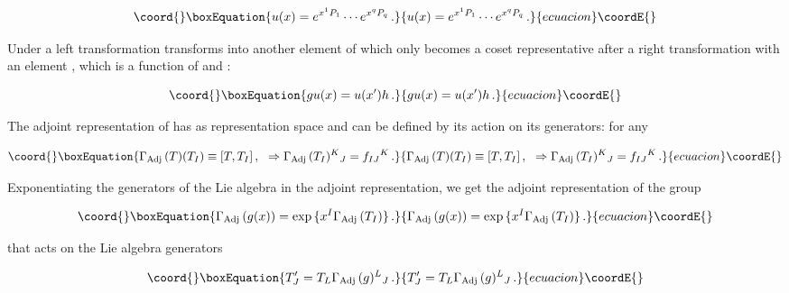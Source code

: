 \documentclass[12pt,a4paper]{article}
\begin{document}
\begin{equation}\coord{}\boxEquation{
\label{eq:cosetrepresentative}
u(x) =  e^{x^{1}P_{1}}\cdots  e^{x^{q}P_{q}}\, .  
}{
u(x) =  e^{x^{1}P_{1}}\cdots  e^{x^{q}P_{q}}\, .  
}{ecuacion}\coordE{}\end{equation}

Under a left transformation \coordHE{}  \coordHE{} transforms into another
element of \coordHE{} which only becomes a coset representative
\coordHE{} after a right transformation with an element \coordHE{},
which is a function of \coordHE{} and \coordHE{}:

\begin{equation}\coord{}\boxEquation{
gu(x) = u(x^{\prime}) h\, .  
}{
gu(x) = u(x^{\prime}) h\, .  
}{ecuacion}\coordE{}\end{equation}

The adjoint representation of \coordHE{} has as representation
space \coordHE{} and can be defined by its action on its
generators: for any \coordHE{}

\begin{equation}\coord{}\boxEquation{
\Gamma_{\rm Adj}\, (T) (T_{I})\equiv [T,T_{I}]\, ,
\,\,\,\, \Rightarrow 
\Gamma_{\rm Adj}\, (T_{I})^{K}{}_{J}= f_{IJ}{}^{K}\, .
}{
\Gamma_{\rm Adj}\, (T) (T_{I})\equiv [T,T_{I}]\, ,
\,\,\,\, \Rightarrow 
\Gamma_{\rm Adj}\, (T_{I})^{K}{}_{J}= f_{IJ}{}^{K}\, .
}{ecuacion}\coordE{}\end{equation}

Exponentiating the generators of the Lie algebra \coordHE{} in the
adjoint representation, we get the adjoint representation of the group
\coordHE{}

\begin{equation}\coord{}\boxEquation{
\Gamma_{\rm Adj}\,(g(x))
=\exp{\{x^{I}\Gamma_{\rm Adj}\,(T_{I})\}}  \, .
}{
\Gamma_{\rm Adj}\,(g(x))
=\exp{\{x^{I}\Gamma_{\rm Adj}\,(T_{I})\}}  \, .
}{ecuacion}\coordE{}\end{equation}

\noindent that acts on the Lie algebra generators

\begin{equation}\coord{}\boxEquation{
T^{\prime}_{J} = T_{L}\Gamma_{\rm Adj}\,(g)^{L}{}_{J} \, .
}{
T^{\prime}_{J} = T_{L}\Gamma_{\rm Adj}\,(g)^{L}{}_{J} \, .
}{ecuacion}\coordE{}\end{equation}
\end{document}
